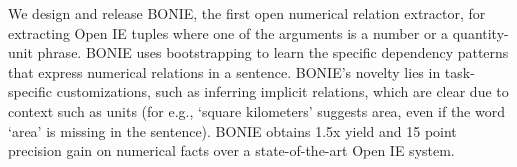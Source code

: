 We design and release BONIE, the first open numerical relation extractor, for extracting Open IE tuples where one of the arguments is a number or a quantity-unit phrase. BONIE uses bootstrapping to learn the specific dependency patterns that express numerical relations in a sentence. BONIE's novelty lies in task-specific customizations, such as inferring implicit relations, which are clear due to context such as units (for e.g., ‘square kilometers' suggests area, even if the word ‘area' is missing in the sentence). BONIE obtains 1.5x yield and 15 point precision gain on numerical facts over a state-of-the-art Open IE system.

